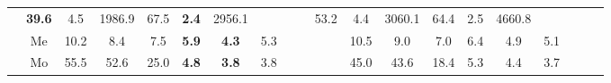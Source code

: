 \documentclass[french,10pt]{article}
\begin{document}
\begin{landscape}
\begin{longtable}{ l  c | c c c | c c c | c c c | c c c | c c c | c c c | }
                    &                     \textbf{ 39.6}
     & {\footnotesize     4.5
    } & {\footnotesize     1986.9
     }
    
    
                    &                     67.5
     & {\footnotesize     \textbf{ 2.4}
    } & {\footnotesize     2956.1
     }
    
    
                    & & &

                    &                     53.2
     & {\footnotesize     4.4
    } & {\footnotesize     3060.1
     }
    
    
                    &                     64.4
     & {\footnotesize     2.5
    } & {\footnotesize     4660.8
     }
    
    
                    & & &

                    \\*
                        & {\small Me  }

                    &                     10.2
     & {\footnotesize     8.4
    } & {\footnotesize     7.5
     }
    
    
                    &                     \textbf{ 5.9}
     & {\footnotesize     \textbf{ 4.3}
    } & {\footnotesize     5.3
     }
    
    
                    & & &

                    &                     10.5
     & {\footnotesize     9.0
    } & {\footnotesize     7.0
     }
    
    
                    &                     6.4
     & {\footnotesize     4.9
    } & {\footnotesize     5.1
     }
    
    
                    & & &

                    \\*
                        & {\small Mo  }

                    &                     55.5
     & {\footnotesize     52.6
    } & {\footnotesize     25.0
     }
    
    
                    &                     \textbf{ 4.8}
     & {\footnotesize     \textbf{ 3.8}
    } & {\footnotesize     3.8
     }
    
    
                    & & &

                    &                     45.0
     & {\footnotesize     43.6
    } & {\footnotesize     18.4
     }
    
    
                    &                     5.3
     & {\footnotesize     4.4
    } & {\footnotesize     3.7
     }
    

\end{longtable}
\end{landscape}
\end{document}
